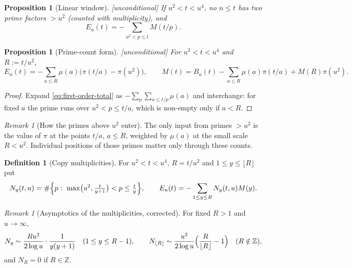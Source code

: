 \documentclass[11pt]{amsart}
\numberwithin{equation}{section}
\theoremstyle{plain}
\newtheorem{proposition}[theorem]{Proposition}
\theoremstyle{definition}
\newtheorem{definition}[theorem]{Definition}
\theoremstyle{remark}
\newtheorem{remark}[theorem]{Remark}
\begin{document}
\begin{proposition}[Linear window]
\label{prop:linear-new-primes}
\emph{[unconditional]} If $u^2<t<u^4$, no $n\le t$ has two prime factors
$>u^2$ (counted with multiplicity), and
\begin{equation}
\label{eq:first-order-total}
  E_u(t)=-\sum_{u^2<p\le t}M(t/p).
\end{equation}
\end{proposition}

\begin{proposition}[Prime-count form]
\label{prop:prime_count_form}
\emph{[unconditional]} For $u^2<t<u^4$ and $R:=t/u^2$,
\begin{equation}
\label{eq:prime_count_form}
  E_u(t)=-\sum_{a\le R}\mu(a)\bigl(\pi(t/a)-\pi(u^2)\bigr),
  \qquad
  M(t)=B_u(t)-\sum_{a\le R}\mu(a)\pi(t/a)+M(R)\pi(u^2).
\end{equation}
\end{proposition}

\begin{proof}
Expand \eqref{eq:first-order-total} as
$-\sum_{p}\sum_{a\le t/p}\mu(a)$ and interchange: for fixed $a$ the prime
runs over $u^2<p\le t/a$, which is non-empty only if $a<R$.
\end{proof}

\begin{remark}[How the primes above $u^2$ enter]
\label{rem:unknown_primes_enter}
The only input from primes $>u^2$ is the value of $\pi$ at the points $t/a$,
$a\le R$, weighted by $\mu(a)$ at the small scale $R<u^2$. Individual
positions of those primes matter only through these counts.
\end{remark}

\begin{definition}[Copy multiplicities]
\label{def:copy-multiplicity}
For $u^2<t<u^4$, $R=t/u^2$ and $1\le y\le\lfloor R\rfloor$ put
\begin{equation}
\label{eq:Ny-exact}
  N_y(t,u)=\#\Bigl\{p:\ \max\bigl(u^2,\tfrac{t}{y+1}\bigr)<p\le\tfrac ty\Bigr\},
  \qquad
  E_u(t)=-\sum_{1\le y\le R}N_y(t,u)M(y).
\end{equation}
\end{definition}

\begin{remark}[Asymptotics of the multiplicities, corrected]
\label{rem:copy-count-asymptotic}
For fixed $R>1$ and $u\to\infty$,
\begin{equation}
\label{eq:Ny-fixed-R}
  N_y\sim\frac{Ru^2}{2\log u}\cdot\frac1{y(y+1)}\quad(1\le y\le R-1),
  \qquad
  N_{\lfloor R\rfloor}\sim\frac{u^2}{2\log u}\Bigl(\frac R{\lfloor R\rfloor}-1\Bigr)
  \quad(R\notin\mathbb{Z}),
\end{equation}
and $N_R=0$ if $R\in\mathbb{Z}$.
\end{remark}
\end{document}
